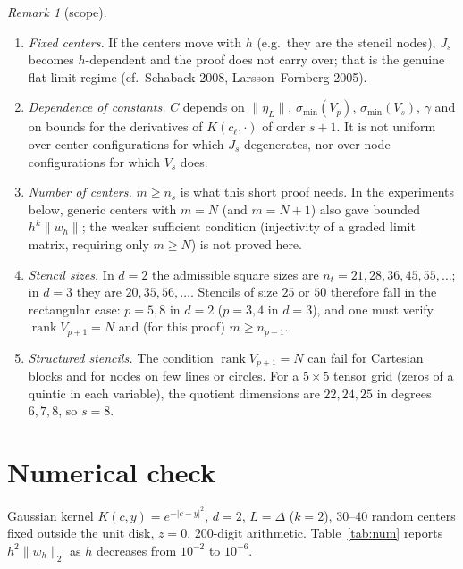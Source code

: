 \documentclass[11pt]{article}
\newcommand{\norm}[1]{\lVert #1\rVert}
\newcommand{\smin}{\sigma_{\min}}
\newcommand{\rank}{\operatorname{rank}}
\theoremstyle{plain}
\theoremstyle{definition}
\theoremstyle{remark}
\newtheorem{remark}{Remark}
\begin{document}
\begin{remark}[scope]
\begin{enumerate}[leftmargin=*,label=(\roman*)]
\item \emph{Fixed centers.} If the centers move with $h$ (e.g.\ they are the stencil nodes), $J_s$ becomes $h$-dependent and the proof does not carry over; that is the genuine flat-limit regime (cf.\ Schaback 2008, Larsson--Fornberg 2005).
\item \emph{Dependence of constants.} $C$ depends on $\norm{\eta_L}$, $\smin(V_p)$, $\smin(V_s)$, $\gamma$ and on bounds for the derivatives of $K(c_\ell,\cdot)$ of order $s+1$. It is not uniform over center configurations for which $J_s$ degenerates, nor over node configurations for which $V_s$ does.
\item \emph{Number of centers.} $m\ge n_s$ is what this short proof needs. In the experiments below, generic centers with $m=N$ (and $m=N+1$) also gave bounded $h^k\norm{w_h}$; the weaker sufficient condition (injectivity of a graded limit matrix, requiring only $m\ge N$) is not proved here.
\item \emph{Stencil sizes.} In $d=2$ the admissible square sizes are $n_t=21,28,36,45,55,\dots$; in $d=3$ they are $20,35,56,\dots$. Stencils of size $25$ or $50$ therefore fall in the rectangular case: $p=5,8$ in $d=2$ ($p=3,4$ in $d=3$), and one must verify $\rank V_{p+1}=N$ and (for this proof) $m\ge n_{p+1}$.
\item \emph{Structured stencils.} The condition $\rank V_{p+1}=N$ can fail for Cartesian blocks and for nodes on few lines or circles. For a $5\times5$ tensor grid (zeros of a quintic in each variable), the quotient dimensions are $22,24,25$ in degrees $6,7,8$, so $s=8$.
\end{enumerate}
\end{remark}

\section{Numerical check}

Gaussian kernel $K(c,y)=e^{-|c-y|^2}$, $d=2$, $L=\Delta$ ($k=2$), $30$--$40$ random centers fixed outside the unit disk, $z=0$, $200$-digit arithmetic. Table~\ref{tab:num} reports $h^2\norm{w_h}_2$ as $h$ decreases from $10^{-2}$ to $10^{-6}$.
\end{document}
